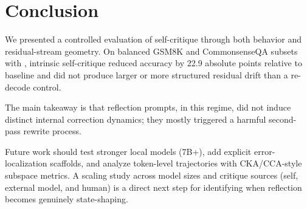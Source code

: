 \section{Conclusion}
\label{sec:conclusion}
We presented a controlled evaluation of self-critique through both behavior and residual-stream geometry. On balanced GSM8K and CommonsenseQA subsets with \qwen, intrinsic self-critique reduced accuracy by 22.9 absolute points relative to baseline and did not produce larger or more structured residual drift than a re-decode control.

The main takeaway is that reflection prompts, in this regime, did not induce distinct internal correction dynamics; they mostly triggered a harmful second-pass rewrite process.

Future work should test stronger local models (7B+), add explicit error-localization scaffolds, and analyze token-level trajectories with CKA/CCA-style subspace metrics. A scaling study across model sizes and critique sources (self, external model, and human) is a direct next step for identifying when reflection becomes genuinely state-shaping.
